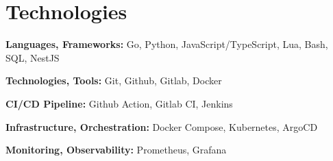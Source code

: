 \section{Technologies}

\begin{onecolentry}
	\textbf{Languages, Frameworks:}
	Go,
	Python,
	JavaScript/TypeScript,
	Lua,
	Bash,
	SQL,
	NestJS
\end{onecolentry}

\vspace{0.2 cm}

\begin{onecolentry}
	\textbf{Technologies, Tools:}
	Git,
	Github,
	Gitlab,
	Docker
\end{onecolentry}

\vspace{0.2 cm}

\begin{onecolentry}
	\textbf{CI/CD Pipeline:}
	Github Action,
	Gitlab CI,
	Jenkins
\end{onecolentry}

\vspace{0.2 cm}

\begin{onecolentry}
	\textbf{Infrastructure, Orchestration:}
	Docker Compose,
	Kubernetes,
	ArgoCD
\end{onecolentry}

\vspace{0.2 cm}

\begin{onecolentry}
	\textbf{Monitoring, Observability:}
	Prometheus,
	Grafana
\end{onecolentry}

%
%
%

\vspace{0.2 cm}
